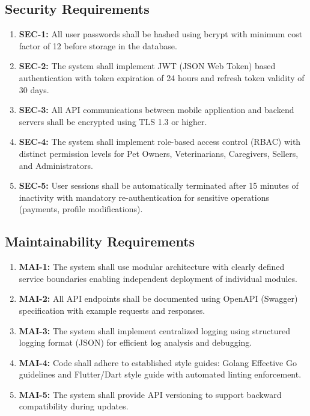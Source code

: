 \subsection{Security Requirements}
\begin{enumerate}
    \item \textbf{SEC-1:} All user passwords shall be hashed using bcrypt with minimum cost factor of 12 before storage in the database.
    \item \textbf{SEC-2:} The system shall implement JWT (JSON Web Token) based authentication with token expiration of 24 hours and refresh token validity of 30 days.
    \item \textbf{SEC-3:} All API communications between mobile application and backend servers shall be encrypted using TLS 1.3 or higher.
    \item \textbf{SEC-4:} The system shall implement role-based access control (RBAC) with distinct permission levels for Pet Owners, Veterinarians, Caregivers, Sellers, and Administrators.
    \item \textbf{SEC-5:} User sessions shall be automatically terminated after 15 minutes of inactivity with mandatory re-authentication for sensitive operations (payments, profile modifications).
\end{enumerate}

\subsection{Maintainability Requirements}
\begin{enumerate}
    \item \textbf{MAI-1:} The system shall use modular architecture with clearly defined service boundaries enabling independent deployment of individual modules.
    \item \textbf{MAI-2:} All API endpoints shall be documented using OpenAPI (Swagger) specification with example requests and responses.
    \item \textbf{MAI-3:} The system shall implement centralized logging using structured logging format (JSON) for efficient log analysis and debugging.
    \item \textbf{MAI-4:} Code shall adhere to established style guides: Golang Effective Go guidelines and Flutter/Dart style guide with automated linting enforcement.
    \item \textbf{MAI-5:} The system shall provide API versioning to support backward compatibility during updates.
\end{enumerate}

